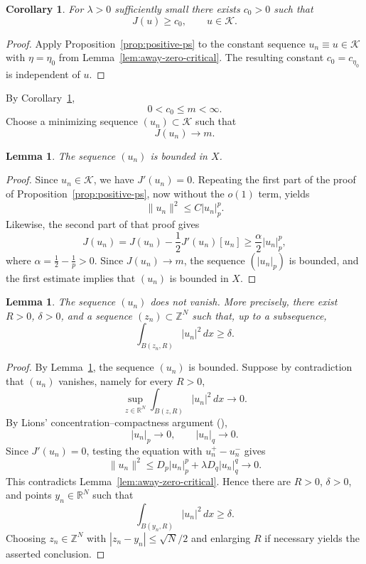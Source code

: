 \documentclass[11pt]{amsart}
\numberwithin{equation}{section}
\newtheorem{lemma}[theorem]{Lemma}
\newtheorem{corollary}[theorem]{Corollary}
\theoremstyle{definition}
\newcommand{\R}{\mathbb{R}}
\newcommand{\Z}{\mathbb{Z}}
\newcommand{\cK}{\mathcal{K}}
\begin{document}
\begin{corollary}\label{cor:critical-positive}
For $\lambda>0$ sufficiently small there exists $c_0>0$ such that
\[
J(u)\ge c_0,
\qquad u\in\cK.
\]
\end{corollary}

\begin{proof}
Apply Proposition~\ref{prop:positive-ps} to the constant sequence
$u_n\equiv u\in\cK$ with $\eta=\eta_0$ from
Lemma~\ref{lem:away-zero-critical}. The resulting constant
$c_0=c_{\eta_0}$ is independent of $u$.
\end{proof}

By Corollary~\ref{cor:critical-positive},
\[
0<c_0\le m<\infty.
\]
Choose a minimizing sequence $(u_n)\subset\cK$ such that
\[
J(u_n)\to m.
\]

\begin{lemma}\label{lem:min-bounded}
The sequence $(u_n)$ is bounded in $X$.
\end{lemma}

\begin{proof}
Since $u_n\in\cK$, we have $J'(u_n)=0$. Repeating the first part of the
proof of Proposition~\ref{prop:positive-ps}, now without the $o(1)$ term,
yields
\[
\|u_n\|^2\le C|u_n|_p^p.
\]
Likewise, the second part of that proof gives
\[
J(u_n)
=J(u_n)-\frac12J'(u_n)[u_n]
\ge\frac{\alpha}{2}|u_n|_p^p,
\]
where $\alpha=\frac12-\frac1p>0$. Since $J(u_n)\to m$, the sequence
$(|u_n|_p)$ is bounded, and the first estimate implies that $(u_n)$ is
bounded in $X$.
\end{proof}

\begin{lemma}\label{lem:no-vanishing}
The sequence $(u_n)$ does not vanish. More precisely, there exist
$R>0$, $\delta>0$, and a sequence $(z_n)\subset\Z^{N}$ such that, up to
a subsequence,
\[
\int_{B(z_n,R)}|u_n|^2\,dx\ge\delta.
\]
\end{lemma}

\begin{proof}
By Lemma~\ref{lem:min-bounded}, the sequence $(u_n)$ is bounded. Suppose by contradiction that $(u_n)$ vanishes, namely for every $R>0$,
\[
\sup_{z\in\R^{N}}\int_{B(z,R)}|u_n|^2\,dx\to0.
\]
By Lions' concentration--compactness argument (\cite{Lions}),
\[
|u_n|_p\to0,\qquad |u_n|_q\to0.
\]
Since $J'(u_n)=0$, testing the equation with $u_n^+-u_n^-$ gives
\[
\|u_n\|^2
\le D_p|u_n|_p^p+\lambda D_q|u_n|_q^q\to0.
\]
This contradicts Lemma~\ref{lem:away-zero-critical}. Hence there are
$R>0$, $\delta>0$, and points $y_n\in\R^N$ such that
\[
\int_{B(y_n,R)}|u_n|^2\,dx\ge\delta.
\]
Choosing $z_n\in\Z^N$ with $|z_n-y_n|\le \sqrt N/2$ and enlarging $R$
if necessary yields the asserted conclusion.
\end{proof}
\end{document}
